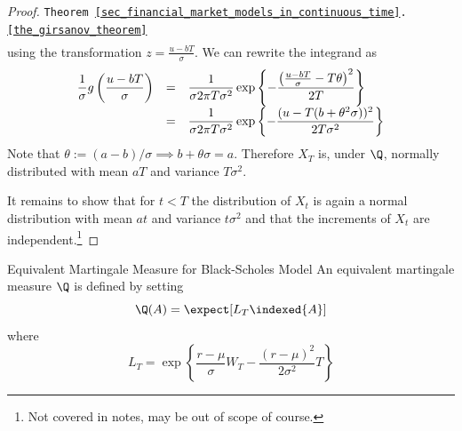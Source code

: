 \documentclass[11pt,a4paper]{article}
\begin{document}
\begin{proof}{\texttt{Theorem \ref{sec_financial_market_models_in_continuous_time}.\ref{the_girsanov_theorem}}}
\[\begin{array}{rcl}
    \end{array}\]
    using the transformation $z=\frac{u-bT}\sigma$.
    We can rewrite the integrand as
    \[\everymath={\displaystyle}\begin{array}{rcl}
      \frac1\sigma g\left(\frac{u-bT}\sigma\right)&=&\frac1{\sigma{2\pi T\sigma^2}}\exp\left\{-\frac{\left(\frac{u-bT}\sigma-T\theta\right)^2}{2T}\right\}\\
      &=&\frac1{\sigma{2\pi T\sigma^2}}\exp\left\{-\frac{(u-T(b+\theta^2\sigma))^2}{2T\sigma^2}\right\}\\
    \end{array}\]
    Note that $\theta:=(a-b)/\sigma\implies b+\theta\sigma=a$. Therefore $X_T$ is, under $\Q$, normally distributed with mean $aT$ and variance $T\sigma^2$.
    \par It remains to show that for $t<T$ the distribution of $X_t$ is again a normal distribution with mean $at$ and variance $t\sigma^2$ and that the increments of $X_t$ are independent.\footnote{Not covered in notes, may be out of scope of course.}\proved
  \end{proof}

  \begin{proposition}{Equivalent Martingale Measure for Black-Scholes Model}\label{prop_equivalent_martingale_measure_for_bs_model}
    An equivalent martingale measure $\Q$ is defined by setting
    \[ \Q(A)=\expect[L_T\indexed\{A\}] \]
    where
    \[ L_T=\exp\left\{\frac{r-\mu}\sigma W_T-\frac{(r-\mu)^2}{2\sigma^2}T\right\} \]
  \end{proposition}
\end{document}
